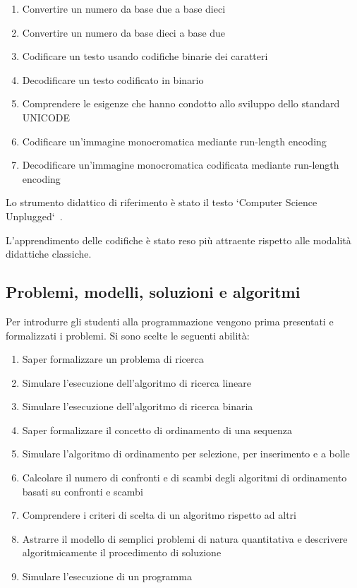 \documentclass[a4paper]{easychair}
\begin{document}
\begin{enumerate}
  \item
    Convertire un numero da base due a base dieci
  \item
    Convertire un numero da base dieci a base due
  \item
    Codificare un testo usando codifiche binarie dei caratteri
  \item
    Decodificare un testo codificato in binario
  \item
    Comprendere le esigenze che hanno condotto allo sviluppo dello
    standard UNICODE
  \item
    Codificare un'immagine monocromatica mediante run-length encoding
  \item
    Decodificare un'immagine monocromatica codificata mediante run-length
    encoding
\end{enumerate}  

Lo strumento didattico di riferimento è stato il testo
`Computer Science Unplugged`~\cite{csu}.

L'apprendimento delle codifiche è stato reso più attraente rispetto alle modalità
didattiche classiche.

\subsection[Problemi e algoritmi]{Problemi, modelli, soluzioni e algoritmi}

Per introdurre gli studenti alla programmazione vengono prima presentati
e formalizzati i problemi.
Si sono scelte le seguenti abilità:

\begin{enumerate}
  \item
    Saper formalizzare un problema di ricerca
  \item
    Simulare l'esecuzione dell'algoritmo di ricerca lineare
  \item
    Simulare l'esecuzione dell'algoritmo di ricerca binaria
  \item
    Saper formalizzare il concetto di ordinamento di una sequenza
  \item
    Simulare l'algoritmo di ordinamento per selezione, per inserimento e a bolle
  \item
    Calcolare il numero di confronti e di scambi degli algoritmi di
    ordinamento basati su confronti e scambi
  \item
    Comprendere i criteri di scelta di un algoritmo rispetto ad altri
  \item
    Astrarre il modello di semplici problemi di natura quantitativa e
    descrivere algoritmicamente il procedimento di soluzione
  \item
    Simulare l'esecuzione di un programma
\end{enumerate}
  
\end{document}

